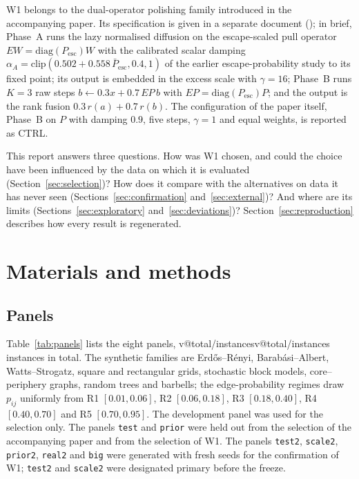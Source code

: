 \documentclass[11pt,a4paper]{article}
\makeatletter
\newcommand{\V}[1]{\ifcsname v@#1\endcsname\csname v@#1\endcsname\else\errmessage{missing value #1}\fi}
\newcommand{\Pesc}{P_{\mathrm{esc}}}
\newcommand{\Pescbar}{\bar{P}_{\mathrm{esc}}}
\newcommand{\p}[1]{\texttt{#1}}
\makeatother
\begin{document}
W1 belongs to the dual-operator polishing family introduced in the accompanying paper. Its specification is given in a separate document (); in brief, Phase~A runs the lazy normalised diffusion on the escape-scaled pull operator $EW=\mathrm{diag}(\Pesc)W$ with the calibrated scalar damping $\alpha_A=\mathrm{clip}(0.502+0.558\,\Pescbar,0.4,1)$ of the earlier escape-probability study to its fixed point; its output is embedded in the excess scale with $\gamma=16$; Phase~B runs $K=3$ raw steps $b\leftarrow0.3x+0.7\,EP\,b$ with $EP=\mathrm{diag}(\Pesc)P$; and the output is the rank fusion $0.3\,r(a)+0.7\,r(b)$. The configuration of the paper itself, Phase~B on $P$ with damping $0.9$, five steps, $\gamma=1$ and equal weights, is reported as CTRL.

This report answers three questions. How was W1 chosen, and could the choice have been influenced by the data on which it is evaluated (Section~\ref{sec:selection})? How does it compare with the alternatives on data it has never seen (Sections~\ref{sec:confirmation} and~\ref{sec:external})? And where are its limits (Sections~\ref{sec:exploratory} and~\ref{sec:deviations})? Section~\ref{sec:reproduction} describes how every result is regenerated.

\section{Materials and methods}\label{sec:materials}

\subsection{Panels}

Table~\ref{tab:panels} lists the eight panels, \V{total/instances} instances in total. The synthetic families are Erdős--Rényi, Barabási--Albert, Watts--Strogatz, square and rectangular grids, stochastic block models, core--periphery graphs, random trees and barbells; the edge-probability regimes draw $p_{ij}$ uniformly from R1 $[0.01,0.06]$, R2 $[0.06,0.18]$, R3 $[0.18,0.40]$, R4 $[0.40,0.70]$ and R5 $[0.70,0.95]$. The development panel was used for the selection only. The panels \p{test} and \p{prior} were held out from the selection of the accompanying paper and from the selection of W1. The panels \p{test2}, \p{scale2}, \p{prior2}, \p{real2} and \p{big} were generated with fresh seeds for the confirmation of W1; \p{test2} and \p{scale2} were designated primary before the freeze.
\end{document}
